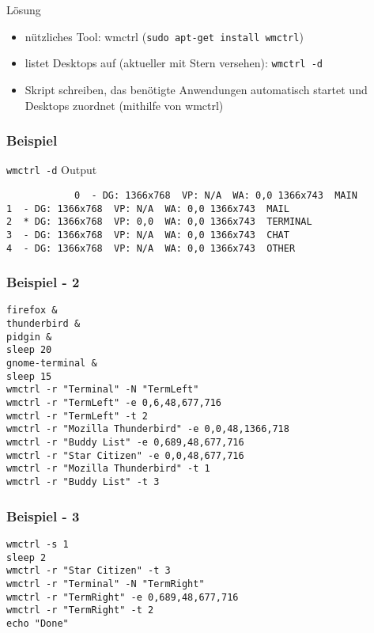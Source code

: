 \documentclass{beamer}
\begin{document}
	\begin{frame}{Lösung}
		\begin{itemize}
			\item nützliches Tool: wmctrl (\texttt{sudo apt-get install wmctrl})
			\item listet Desktops auf (aktueller mit Stern versehen): \texttt{wmctrl -d}
			\item Skript schreiben, das benötigte Anwendungen automatisch startet und Desktops zuordnet (mithilfe von wmctrl)
		\end{itemize}		
	\end{frame}
	
	\begin{frame}[fragile]
		\frametitle{Beispiel}
		\texttt{wmctrl -d} Output
		\begin{verbatim}
			0  - DG: 1366x768  VP: N/A  WA: 0,0 1366x743  MAIN
1  - DG: 1366x768  VP: N/A  WA: 0,0 1366x743  MAIL
2  * DG: 1366x768  VP: 0,0  WA: 0,0 1366x743  TERMINAL
3  - DG: 1366x768  VP: N/A  WA: 0,0 1366x743  CHAT
4  - DG: 1366x768  VP: N/A  WA: 0,0 1366x743  OTHER
		\end{verbatim}
	\end{frame}
	
	\begin{frame}[fragile]
		\frametitle{Beispiel - 2}
		\begin{verbatim}			
firefox &
thunderbird &
pidgin &
sleep 20
gnome-terminal &
sleep 15
wmctrl -r "Terminal" -N "TermLeft"
wmctrl -r "TermLeft" -e 0,6,48,677,716
wmctrl -r "TermLeft" -t 2
wmctrl -r "Mozilla Thunderbird" -e 0,0,48,1366,718
wmctrl -r "Buddy List" -e 0,689,48,677,716
wmctrl -r "Star Citizen" -e 0,0,48,677,716
wmctrl -r "Mozilla Thunderbird" -t 1
wmctrl -r "Buddy List" -t 3
		\end{verbatim}
	\end{frame}
	
	\begin{frame}[fragile]
		\frametitle{Beispiel - 3}
		\begin{verbatim}
wmctrl -s 1	
sleep 2
wmctrl -r "Star Citizen" -t 3
wmctrl -r "Terminal" -N "TermRight"
wmctrl -r "TermRight" -e 0,689,48,677,716
wmctrl -r "TermRight" -t 2
echo "Done"
		\end{verbatim}
	\end{frame}
\end{document}

